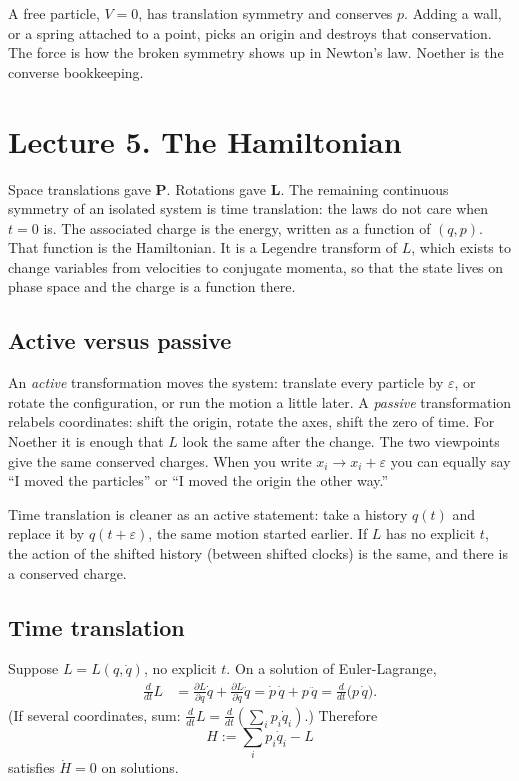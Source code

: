 \documentclass[11pt]{article}
\numberwithin{equation}{section}
\newcommand{\qdot}{\dot{q}}
\newcommand{\ddt}{\frac{d}{dt}}
\newcommand{\pd}[2]{\frac{\partial #1}{\partial #2}}
\newcommand{\vect}[1]{\mathbf{#1}}
\begin{document}
A free particle, $V=0$, has translation symmetry and conserves $p$. Adding a wall, or a spring attached to a point, picks an origin and destroys that conservation. The force is how the broken symmetry shows up in Newton's law. Noether is the converse bookkeeping.

\section{Lecture 5. The Hamiltonian}

Space translations gave $\vect{P}$. Rotations gave $\vect{L}$. The remaining continuous symmetry of an isolated system is time translation: the laws do not care when $t=0$ is. The associated charge is the energy, written as a function of $(q,p)$. That function is the Hamiltonian. It is a Legendre transform of $L$, which exists to change variables from velocities to conjugate momenta, so that the state lives on phase space and the charge is a function there.

\subsection{Active versus passive}

An \emph{active} transformation moves the system: translate every particle by $\varepsilon$, or rotate the configuration, or run the motion a little later. A \emph{passive} transformation relabels coordinates: shift the origin, rotate the axes, shift the zero of time. For Noether it is enough that $L$ look the same after the change. The two viewpoints give the same conserved charges. When you write $x_i\to x_i+\varepsilon$ you can equally say ``I moved the particles'' or ``I moved the origin the other way.''

Time translation is cleaner as an active statement: take a history $q(t)$ and replace it by $q(t+\varepsilon)$, the same motion started earlier. If $L$ has no explicit $t$, the action of the shifted history (between shifted clocks) is the same, and there is a conserved charge.

\subsection{Time translation}

Suppose $L=L(q,\qdot)$, no explicit $t$. On a solution of Euler-Lagrange,
\begin{align*}
\ddt L
&= \pd{L}{q}\qdot + \pd{L}{\qdot}\ddot q
= \dot p\,\qdot + p\,\ddot q
= \ddt\bigl(p\,\qdot\bigr).
\end{align*}
(If several coordinates, sum: $\ddt L=\ddt(\sum_i p_i\qdot_i)$.) Therefore
\begin{equation}
\label{eq:Hdef}
H := \sum_i p_i\qdot_i - L
\end{equation}
satisfies $\dot H=0$ on solutions.
\end{document}
